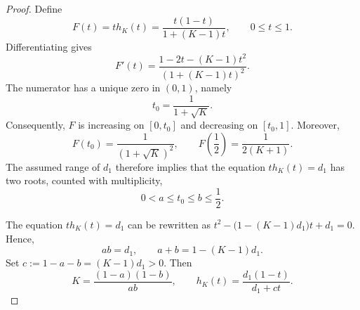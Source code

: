 \documentclass[10pt,a4paper]{amsart}
\begin{document}
\begin{proof}
Define
\begin{equation*}
 F(t)=t h_K(t)
     =\frac{t(1-t)}{1+(K-1)t},
 \qquad 0\leq t\leq1.
\end{equation*}
Differentiating gives
\begin{equation*}
 F'(t)
 =
 \frac{1-2t-(K-1)t^2}
      {(1+(K-1)t)^2}.
\end{equation*}
The numerator has a unique zero in $(0,1)$, namely
\begin{equation*}
 t_0=\frac{1}{1+\sqrt K}.
\end{equation*}
Consequently, $F$ is increasing on $[0,t_0]$ and decreasing on
$[t_0,1]$. Moreover,
\begin{equation*}
 F(t_0)=\frac{1}{(1+\sqrt K)^2},
 \qquad
 F\left(\frac12\right)=\frac{1}{2(K+1)}.
\end{equation*}
The assumed range of $d_1$ therefore implies that the equation
$
 t h_K(t)=d_1
$
has two roots, counted with multiplicity,
\begin{equation*}
 0<a\leq t_0\leq b\leq\frac12.
\end{equation*}

The equation $t h_K(t)=d_1$ can be rewritten as
$
 t^2-\bigl(1-(K-1)d_1\bigr)t+d_1=0.
$
Hence,
\begin{equation*}
 ab=d_1,
 \qquad
 a+b=1-(K-1)d_1.
\end{equation*}
Set
$
 c:=1-a-b=(K-1)d_1>0.
$
Then
\begin{equation*}
 K=\frac{(1-a)(1-b)}{ab},\qquad
 h_K(t)
 =
 \frac{d_1(1-t)}{d_1+ct}.
\end{equation*}


\end{proof}
\end{document}
